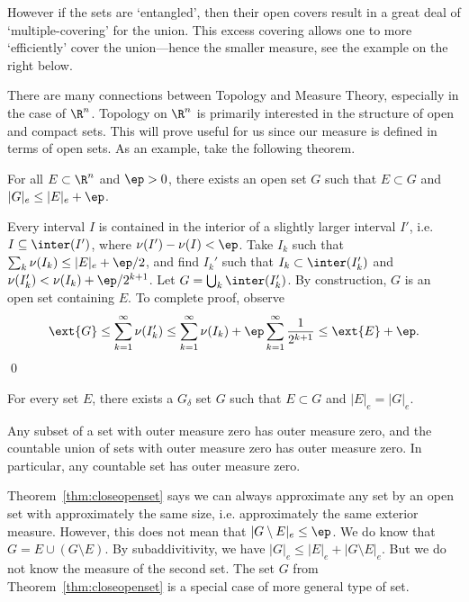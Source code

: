 
\noindent However if the sets are `entangled', then their open covers result in a great deal of `multiple-covering' for the union. This excess covering allows one to more `efficiently' cover the union---hence the smaller measure, see the example on the right below. 



There are many connections between Topology and Measure Theory, especially in the case of $\R^n$. Topology on $\R^n$ is primarily interested in the structure of open and compact sets. This will prove useful for us since our measure is defined in terms of open sets. As an example, take the following theorem. 


\begin{thm} \label{thm:closeopenset}
For all $E \subset \R^n$ and $\ep>0$, there exists an open set $G$ such that $E \subset G$ and $|G|_e \leq |E|_e + \ep$.
\end{thm}

\pf Every interval $I$ is contained in the interior of a slightly larger interval $I'$, i.e. $I \subseteq \inter(I')$, where $\nu(I')  - \nu(I)<\ep$. Take $I_k$ such that $\sum_k \nu(I_k) \leq |E|_e + \ep/2$, and find $I_k'$ such that $I_k \subset \inter (I_k')$ and $\nu(I_k') < \nu(I_k) + \ep/2^{k+1}$. Let $G= \bigcup_k \inter(I_k')$. By construction, $G$ is an open set containing $E$. To complete proof, observe
	\[
	\ext{G} \leq \sum_{k=1}^\infty \nu(I_k') \leq \sum_{k=1}^\infty \nu(I_k) + \ep \sum_{k=1}^\infty \dfrac{1}{2^{k+1}} \leq \ext{E} + \ep.
	\] \qed \\


\begin{cor} \label{cor:gdeltaclose}
For every set $E$, there exists a $G_\delta$ set $G$ such that $E \subset G$ and $|E|_e=|G|_e$.
\end{cor}


\begin{cor} \label{cor:countmeasurezero}
Any subset of a set with outer measure zero has outer measure zero, and the countable union of sets with outer measure zero has outer measure zero. In particular, any countable set has outer measure zero. 
\end{cor}


Theorem~\ref{thm:closeopenset} says we can always approximate any set by an open set with approximately the same size, i.e. approximately the same exterior measure. However, this does not mean that $|G \setminus E|_e \leq \ep$. We do know that $G = E \cup (G\setminus E)$. By subaddivitivity, we have $|G|_e \leq |E|_e + |G \setminus E|_e$. But we do not know the measure of the second set. The set $G$ from Theorem~\ref{thm:closeopenset} is a special case of more general type of set.


